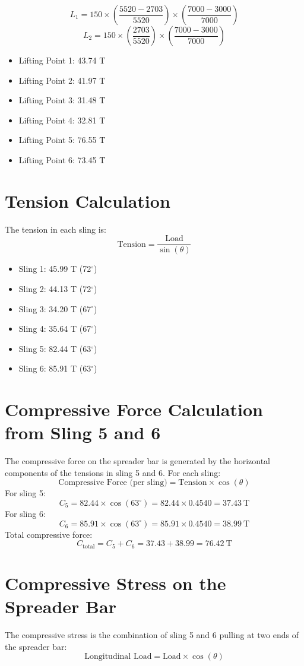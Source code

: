 \documentclass[12pt]{article}
\begin{document}
\[ L_1 = 150 \times \left( \frac{5520-2703}{5520} \right) \times \left( \frac{7000-3000}{7000} \right) \]
\[ L_2 = 150 \times \left( \frac{2703}{5520} \right) \times \left( \frac{7000-3000}{7000} \right)\]


\begin{itemize}
  \item Lifting Point 1: 43.74 T
  \item Lifting Point 2: 41.97 T
  \item Lifting Point 3: 31.48 T
  \item Lifting Point 4: 32.81 T
  \item Lifting Point 5: 76.55 T
  \item Lifting Point 6: 73.45 T
\end{itemize}

\section{Tension Calculation}
The tension in each sling is:
\[
\text{Tension} = \frac{\text{Load}}{\sin(\theta)}
\]
\begin{itemize}
  \item Sling 1: 45.99 T (72$^\circ$)
  \item Sling 2: 44.13 T (72$^\circ$)
  \item Sling 3: 34.20 T (67$^\circ$)
  \item Sling 4: 35.64 T (67$^\circ$)
  \item Sling 5: 82.44 T (63$^\circ$)
  \item Sling 6: 85.91 T (63$^\circ$)
\end{itemize}

\section{Compressive Force Calculation from Sling 5 and 6}
The compressive force on the spreader bar is generated by the horizontal components of the tensions in sling 5 and 6. For each sling:
\[
\text{Compressive Force (per sling)} = \text{Tension} \times \cos(\theta)
\]
For sling 5:
\[
C_5 = 82.44 \times \cos(63^\circ) = 82.44 \times 0.4540 = 37.43~\text{T}
\]
For sling 6:
\[
C_6 = 85.91 \times \cos(63^\circ) = 85.91 \times 0.4540 = 38.99~\text{T}
\]
Total compressive force:
\[
C_{\text{total}} = C_5 + C_6 = 37.43 + 38.99 = 76.42~\text{T}
\]

\section{Compressive Stress on the Spreader Bar}
The compressive stress is the combination of sling 5 and 6 pulling at two ends of the spreader bar:
\[
\text{Longitudinal Load} = \text{Load} \times \cos(\theta)
\]
\end{document}
